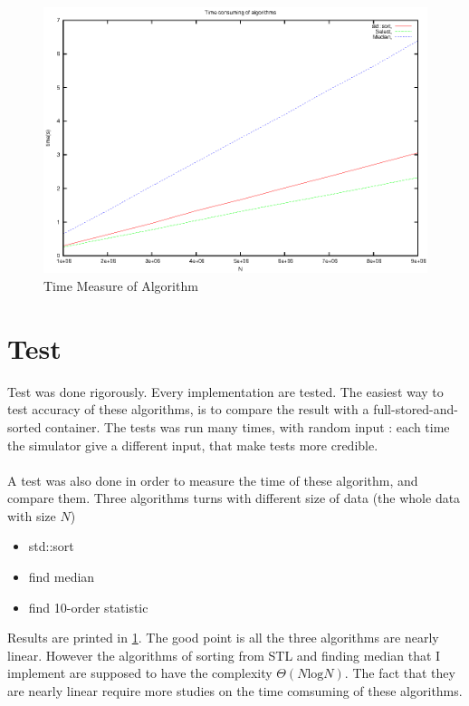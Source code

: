 \documentclass[a4paper,10pt]{article}
\begin{document}
\begin {figure}
\begin{center}
\includegraphics[scale=1.0]{output_time_measure}
\caption{\label{fig:time_measure}Time Measure of Algorithm}
\end{center}
\end {figure}
\section{Test}
Test was done rigorously. Every implementation are tested. The easiest way to test accuracy of these algorithms, is to compare the result with a full-stored-and-sorted container. The tests was run many times, with random input : each time the simulator give a different input, that make tests more credible.
\paragraph{} A test was also done in order to measure the time of these algorithm, and compare them. Three algorithms turns with different size of data (the whole data with size $N$)
\begin{itemize}
 \item std::sort
 \item find median
 \item find 10-order statistic
\end{itemize}
Results are printed in \ref{fig:time_measure}. The good point is all the three algorithms are nearly linear. However the algorithms of sorting from STL and finding median that I implement are supposed to have the complexity $\Theta(N\text{log}N)$. The fact that they are nearly linear require more studies on the time comsuming of these algorithms.


\end{document}
